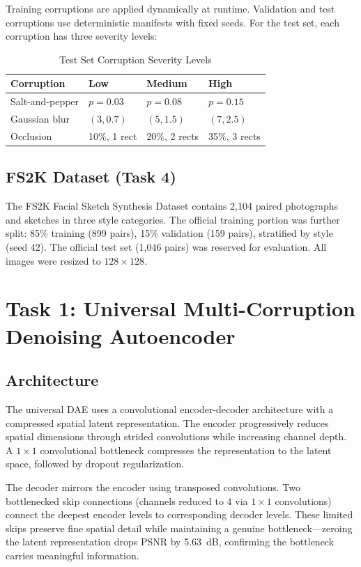 \documentclass[conference]{IEEEtran}
\begin{document}
Training corruptions are applied dynamically at runtime. Validation and test corruptions use deterministic manifests with fixed seeds. For the test set, each corruption has three severity levels:

\begin{table}[h]
\centering
\caption{Test Set Corruption Severity Levels}
\label{tab:severity}
\begin{tabular}{llll}
\toprule
Corruption & Low & Medium & High \\
\midrule
Salt-and-pepper & $p=0.03$ & $p=0.08$ & $p=0.15$ \\
Gaussian blur & $(3, 0.7)$ & $(5, 1.5)$ & $(7, 2.5)$ \\
Occlusion & 10\%, 1 rect & 20\%, 2 rects & 35\%, 3 rects \\
\bottomrule
\end{tabular}
\end{table}

\subsection{FS2K Dataset (Task 4)}

The FS2K Facial Sketch Synthesis Dataset contains 2,104 paired photographs and sketches in three style categories. The official training portion was further split: 85\% training (899 pairs), 15\% validation (159 pairs), stratified by style (seed 42). The official test set (1,046 pairs) was reserved for evaluation. All images were resized to $128 \times 128$.

\section{Task 1: Universal Multi-Corruption Denoising Autoencoder}

\subsection{Architecture}

The universal DAE uses a convolutional encoder-decoder architecture with a compressed spatial latent representation. The encoder progressively reduces spatial dimensions through strided convolutions while increasing channel depth. A $1 \times 1$ convolutional bottleneck compresses the representation to the latent space, followed by dropout regularization.

The decoder mirrors the encoder using transposed convolutions. Two bottlenecked skip connections (channels reduced to 4 via $1 \times 1$ convolutions) connect the deepest encoder levels to corresponding decoder levels. These limited skips preserve fine spatial detail while maintaining a genuine bottleneck—zeroing the latent representation drops PSNR by 5.63~dB, confirming the bottleneck carries meaningful information.
\end{document}
